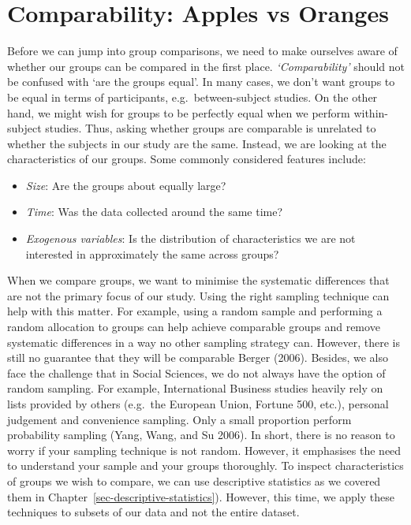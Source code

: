 \documentclass[
  letterpaper,
]{krantz}
\begin{document}
\section{Comparability: Apples vs
Oranges}\label{sec-comparability-apples-vs-oranges}

Before we can jump into group comparisons, we need to make ourselves
aware of whether our groups can be compared in the first place.
\emph{`Comparability'} should not be confused with `are the groups
equal'. In many cases, we don't want groups to be equal in terms of
participants, e.g.~between-subject studies. On the other hand, we might
wish for groups to be perfectly equal when we perform within-subject
studies. Thus, asking whether groups are comparable is unrelated to
whether the subjects in our study are the same. Instead, we are looking
at the characteristics of our groups. Some commonly considered features
include:

\begin{itemize}
\item
  \emph{Size}: Are the groups about equally large?
\item
  \emph{Time}: Was the data collected around the same time?
\item
  \emph{Exogenous variables}: Is the distribution of characteristics we
  are not interested in approximately the same across groups?
\end{itemize}

When we compare groups, we want to minimise the systematic differences
that are not the primary focus of our study. Using the right sampling
technique can help with this matter. For example, using a random sample
and performing a random allocation to groups can help achieve comparable
groups and remove systematic differences in a way no other sampling
strategy can. However, there is still no guarantee that they will be
comparable Berger (2006). Besides, we also face the challenge that in
Social Sciences, we do not always have the option of random sampling.
For example, International Business studies heavily rely on lists
provided by others (e.g.~the European Union, Fortune 500, etc.),
personal judgement and convenience sampling. Only a small proportion
perform probability sampling (Yang, Wang, and Su 2006). In short, there
is no reason to worry if your sampling technique is not random. However,
it emphasises the need to understand your sample and your groups
thoroughly. To inspect characteristics of groups we wish to compare, we
can use descriptive statistics as we covered them in
Chapter~\ref{sec-descriptive-statistics}). However, this time, we apply
these techniques to subsets of our data and not the entire dataset.
\end{document}
